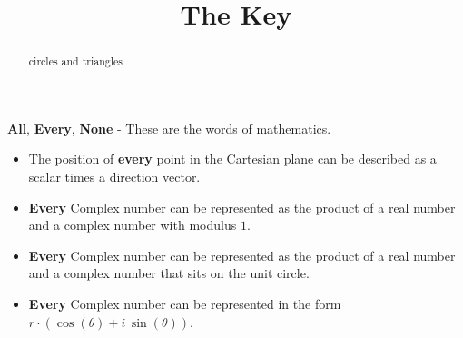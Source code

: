 \documentclass{ximera}
\title{The Key}
\begin{document}
\begin{abstract}
circles and triangles
\end{abstract}
\maketitle





\textbf{\textcolor{red!70!black}{All}}, \textbf{\textcolor{red!70!black}{Every}}, \textbf{\textcolor{red!70!black}{None}} - These are the words of mathematics. 



\begin{itemize}
\item The position of \textbf{\textcolor{red!70!black}{every}} point in the Cartesian plane can be described as a scalar times a direction vector.  

\item \textbf{\textcolor{red!70!black}{Every}} Complex number can be represented as the product of a real number and a complex number with modulus $1$.

\item \textbf{\textcolor{red!70!black}{Every}} Complex number can be represented as the product of a real number and a complex number that sits on the unit circle.

\item \textbf{\textcolor{red!70!black}{Every}} Complex number can be represented in the form \textbf{\textcolor{purple!85!blue}{$r \cdot (\cos(\theta) + i \, \sin(\theta))$}}.
\end{itemize}
\end{document}
